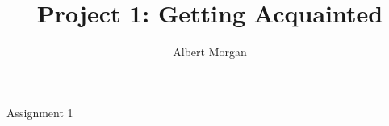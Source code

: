 \documentclass[10pt,journal,draftclsnofoot,onecolumn]{IEEEtran}
\begin{document}
\singlespace




%
\title{\vspace{2in}Project 1: Getting Acquainted}
%
%
%

\author{Albert Morgan}

% 
%



%
{Assignment 1}
% 
\end{document}
